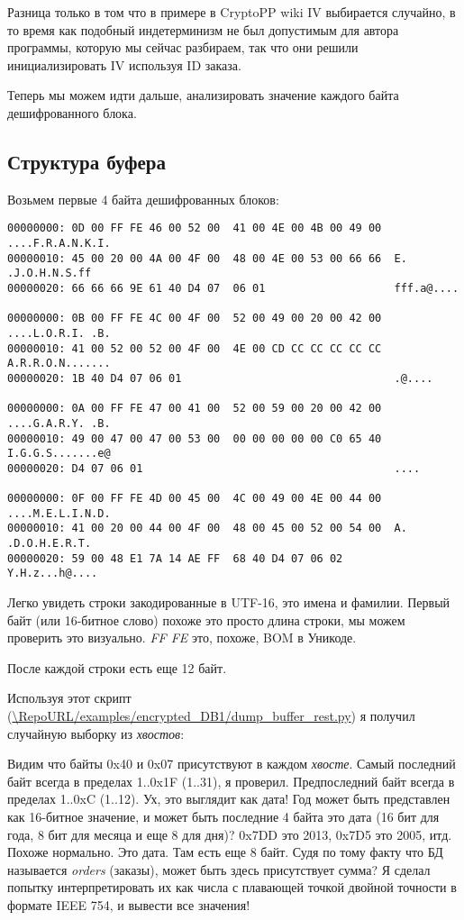 Разница только в том что в примере в CryptoPP wiki \ac{IV} выбирается случайно, в то время как подобный индетерминизм
не был допустимым для автора программы, которую мы сейчас разбираем,
так что они решили инициализировать \ac{IV} используя ID заказа.

Теперь мы можем идти дальше, анализировать значение каждого байта дешифрованного блока.

\subsection{Структура буфера}

Возьмем первые 4 байта дешифрованных блоков:

\begin{lstlisting}
00000000: 0D 00 FF FE 46 00 52 00  41 00 4E 00 4B 00 49 00  ....F.R.A.N.K.I.
00000010: 45 00 20 00 4A 00 4F 00  48 00 4E 00 53 00 66 66  E. .J.O.H.N.S.ff
00000020: 66 66 66 9E 61 40 D4 07  06 01                    fff.a@....

00000000: 0B 00 FF FE 4C 00 4F 00  52 00 49 00 20 00 42 00  ....L.O.R.I. .B.
00000010: 41 00 52 00 52 00 4F 00  4E 00 CD CC CC CC CC CC  A.R.R.O.N.......
00000020: 1B 40 D4 07 06 01                                 .@....

00000000: 0A 00 FF FE 47 00 41 00  52 00 59 00 20 00 42 00  ....G.A.R.Y. .B.
00000010: 49 00 47 00 47 00 53 00  00 00 00 00 00 C0 65 40  I.G.G.S.......e@
00000020: D4 07 06 01                                       ....

00000000: 0F 00 FF FE 4D 00 45 00  4C 00 49 00 4E 00 44 00  ....M.E.L.I.N.D.
00000010: 41 00 20 00 44 00 4F 00  48 00 45 00 52 00 54 00  A. .D.O.H.E.R.T.
00000020: 59 00 48 E1 7A 14 AE FF  68 40 D4 07 06 02        Y.H.z...h@....
\end{lstlisting}

Легко увидеть строки закодированные в UTF-16, это имена и фамилии.
Первый байт (или 16-битное слово) похоже это просто длина строки, мы можем проверить это визуально.
\emph{FF FE} это, похоже, \ac{BOM} в Уникоде.

После каждой строки есть еще 12 байт.

Используя этот скрипт
(\url{\RepoURL/examples/encrypted_DB1/dump_buffer_rest.py})
я получил случайную выборку из \emph{хвостов}:



Видим что байты 0x40 и 0x07 присутствуют в каждом \emph{хвосте}.
Самый последний байт всегда в пределах 1..0x1F (1..31), я проверил.
Предпоследний байт всегда в пределах 1..0xC (1..12).
Ух, это выглядит как дата!
Год может быть представлен как 16-битное значение, и может быть последние 4 байта это дата (16 бит для года, 8 бит для
месяца и еще 8 для дня)?
0x7DD это 2013, 0x7D5 это 2005, итд. Похоже нормально. Это дата.
Там есть еще 8 байт.
Судя по тому факту что БД называется \emph{orders} (заказы), может быть здесь присутствует сумма?
Я сделал попытку интерпретировать их как числа с плавающей точкой двойной точности в формате IEEE 754, и вывести все значения!

